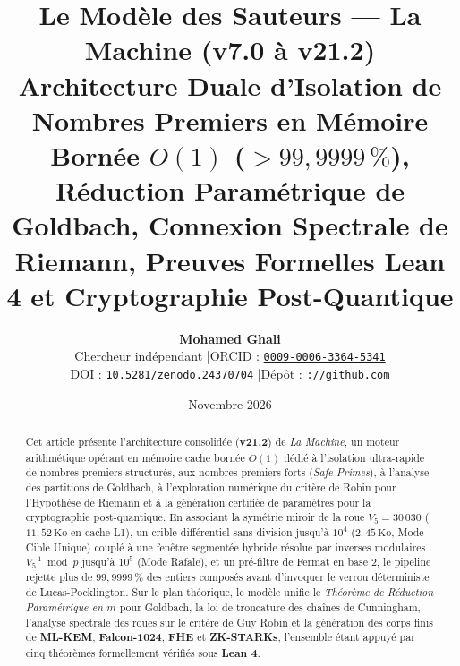 \documentclass[11pt,a4paper]{article}
\title{\texorpdfstring{\textbf{\color{navy}Le Modèle des Sauteurs — La Machine (v7.0 à v21.2)}}{Le Modele des Sauteurs - La Machine (v7.0 a v21.2)}\\
\texorpdfstring{\large Architecture Duale d'Isolation de Nombres Premiers en Mémoire Bornée $O(1)$ ($> 99{,}9999\,\%$), Réduction Paramétrique de Goldbach, Connexion Spectrale de Riemann, Preuves Formelles Lean 4 et Cryptographie Post-Quantique}{Architecture Duale d'Isolation de Nombres Premiers en Memoire Bornee O(1)}}
\author{\textbf{Mohamed Ghali}\\
\small Chercheur indépendant \quad|\quad ORCID : \href{https://orcid.org}{\texttt{0009-0006-3364-5341}}\\
\small DOI : \href{https://doi.org}{\texttt{10.5281/zenodo.24370704}} \quad|\quad Dépôt : \href{https://github.com}{\texttt{://github.com}}}
\date{Novembre 2026}
\begin{document}
\maketitle

\begin{abstract}
Cet article présente l'architecture consolidée (\textbf{v21.2}) de \emph{La Machine}, un moteur arithmétique opérant en mémoire cache bornée $O(1)$ dédié à l'isolation ultra-rapide de nombres premiers structurés, aux nombres premiers forts (\emph{Safe Primes}), à l'analyse des partitions de Goldbach, à l'exploration numérique du critère de Robin pour l'Hypothèse de Riemann et à la génération certifiée de paramètres pour la cryptographie post-quantique. En associant la symétrie miroir de la roue $V_5 = 30\,030$ ($11{,}52\,\text{Ko}$ en cache L1), un crible différentiel sans division jusqu'à $10^4$ ($2{,}45\,\text{Ko}$, Mode Cible Unique) couplé à une fenêtre segmentée hybride résolue par inverses modulaires $V_5^{-1} \bmod p$ jusqu'à $10^5$ (Mode Rafale), et un pré-filtre de Fermat en base $2$, le pipeline rejette plus de \textbf{$99{,}9999\,\%$} des entiers composés avant d'invoquer le verrou déterministe de Lucas-Pocklington. Sur le plan théorique, le modèle unifie le \emph{Théorème de Réduction Paramétrique en $m$} pour Goldbach, la loi de troncature des chaînes de Cunningham, l'analyse spectrale des roues sur le critère de Guy Robin et la génération des corps finis de \textbf{ML-KEM}, \textbf{Falcon-1024}, \textbf{FHE} et \textbf{ZK-STARKs}, l'ensemble étant appuyé par cinq théorèmes formellement vérifiés sous \textbf{Lean 4}.
\end{abstract}
\end{document}
